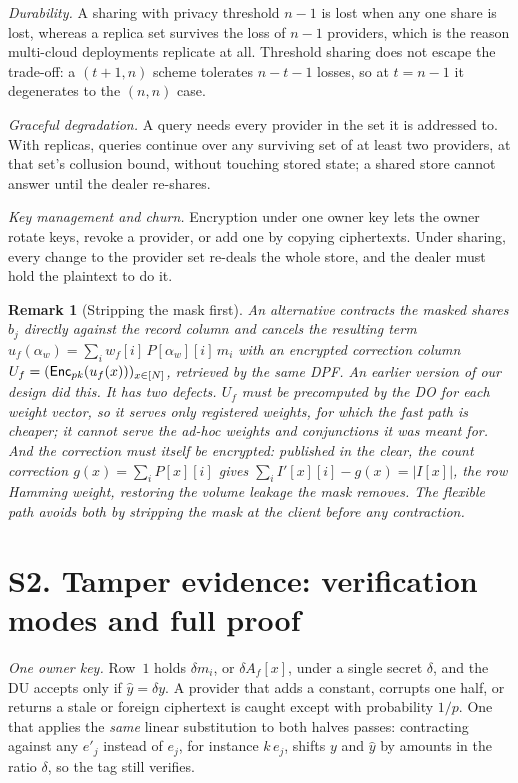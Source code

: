 \documentclass[11pt,a4paper]{article}
\newtheorem{remark}{Remark}[section]
\begin{document}
\emph{Durability.} A sharing with privacy threshold $n-1$ is lost when any one
share is lost, whereas a replica set survives the loss of $n-1$ providers,
which is the reason multi-cloud deployments replicate at all. Threshold
sharing does not escape the trade-off: a $(t{+}1,n)$ scheme tolerates
$n-t-1$ losses, so at $t=n-1$ it degenerates to the $(n,n)$ case.

\emph{Graceful degradation.} A query needs every provider in the set it is
addressed to. With replicas, queries continue over any surviving set of at
least two providers, at that set's collusion bound, without touching stored
state; a shared store cannot answer until the dealer re-shares.

\emph{Key management and churn.} Encryption under one owner key lets the owner
rotate keys, revoke a provider, or add one by copying ciphertexts. Under
sharing, every change to the provider set re-deals the whole store, and the
dealer must hold the plaintext to do it.

\begin{remark}[Stripping the mask first]
\label{rem:whyenc}
An alternative contracts the masked shares $b_j$ directly against the record
column and cancels the resulting term
$u_f(\alpha_w)=\sum_i w_f[i]\,P[\alpha_w][i]\,m_i$ with an encrypted correction
column $U_f=(\mathsf{Enc}_{pk}(u_f(x)))_{x\in[N]}$, retrieved by the same DPF. An
earlier version of our design did this. It has two defects. $U_f$ must be precomputed by
the DO for each weight vector, so it serves only registered weights, for which
the fast path is cheaper; it cannot serve the ad-hoc weights and conjunctions
it was meant for. And the correction must itself be encrypted: published in the
clear, the count correction $g(x)=\sum_iP[x][i]$ gives
$\sum_iI'[x][i]-g(x)=|I[x]|$, the row Hamming weight, restoring the volume
leakage the mask removes. The flexible path avoids both by stripping the mask
at the client before any contraction.
\end{remark}

\section*{S2. Tamper evidence: verification modes and full proof}

\emph{One owner key.} Row~$1$ holds $\delta m_i$, or $\delta A_f[x]$, under a
single secret $\delta$, and the DU accepts only if $\hat y=\delta y$. A provider
that adds a constant, corrupts one half, or returns a stale or foreign
ciphertext is caught except with probability $1/p$. One that applies the
\emph{same} linear substitution to both halves passes: contracting against any
$e'_j$ instead of $e_j$, for instance $k\,e_j$, shifts $y$ and $\hat y$ by
amounts in the ratio $\delta$, so the tag still verifies.
\end{document}
